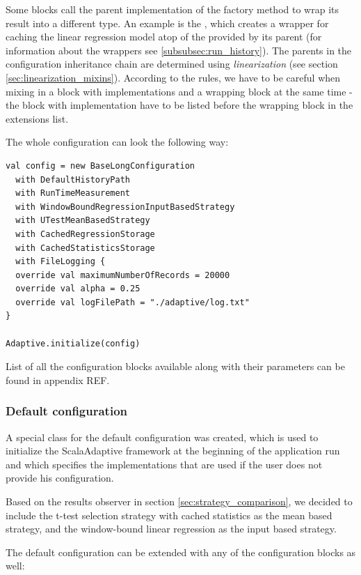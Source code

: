  Some blocks call the parent implementation of the factory method to wrap its result into a different type. An example is the , which creates a wrapper for caching the linear regression model atop of the  provided by its parent (for information about the wrappers see \ref{subsubsec:run_history}). The parents in the configuration inheritance chain are determined using \textit{linearization} (see section \ref{sec:linearization_mixins}). According to the rules, we have to be careful when mixing in a block with implementations and a wrapping block at the same time - the block with implementation have to be listed before the wrapping block in the extensions list.
 
 The whole configuration can look the following way:

\lstset{style=Scala}
\begin{lstlisting}
val config = new BaseLongConfiguration
  with DefaultHistoryPath
  with RunTimeMeasurement
  with WindowBoundRegressionInputBasedStrategy
  with UTestMeanBasedStrategy
  with CachedRegressionStorage
  with CachedStatisticsStorage
  with FileLogging {
  override val maximumNumberOfRecords = 20000
  override val alpha = 0.25
  override val logFilePath = "./adaptive/log.txt"
}

Adaptive.initialize(config)
\end{lstlisting}

List of all the configuration blocks available along with their parameters can be found in appendix REF.


\subsubsection{Default configuration}

A special class for the default configuration was created, which is used to initialize the ScalaAdaptive framework at the beginning of the application run and which specifies the implementations that are used if the user does not provide his configuration.

Based on the results observer in section \ref{sec:strategy_comparison}, we decided to include the t-test selection strategy with cached statistics as the mean based strategy, and the window-bound linear regression as the input based strategy.

The default configuration can be extended with any of the configuration blocks as well:

